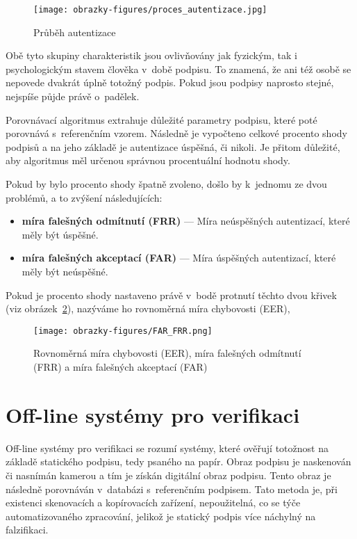 \begin{figure}[H]
  \centering
  \texttt{[image: obrazky-figures/proces\_autentizace.jpg]}
  \caption{Průběh autentizace~\cite{DrahanskýMartin2011}}
  \label{fig:proces_autentizace}
\end{figure}

Obě tyto skupiny charakteristik jsou ovlivňovány jak fyzickým, tak i psychologickým stavem člověka v~době podpisu.
To znamená, že ani též osobě se nepovede dvakrát úplně totožný podpis.
Pokud jsou podpisy naprosto stejné, nejspíše půjde právě o~padělek.

Porovnávací algoritmus extrahuje důležité parametry podpisu, které poté porovnává s~referenčním vzorem. 
Následně je vypočteno celkové procento shody podpisů a na jeho základě je autentizace úspěšná, či nikoli.
Je přitom důležité, aby algoritmus měl určenou správnou procentuální hodnotu shody. 

Pokud by bylo procento shody špatně zvoleno, došlo by k~jednomu ze dvou problémů, a to zvýšení následujících:
\begin{itemize}
  \item \textbf{míra falešných odmítnutí (FRR)} --- Míra neúspěšných autentizací, které měly být úspěšné.
  \item \textbf{míra falešných akceptací (FAR)} --- Míra úspěšných autentizací, které měly být neúspěšné.
\end{itemize}

Pokud je procento shody nastaveno právě v~bodě protnutí těchto dvou křivek (viz obrázek~\ref{fig:FAR_FRR}), nazýváme ho rovnoměrná míra chybovosti (EER), 

\begin{figure}[H]
  \centering
  \texttt{[image: obrazky-figures/FAR\_FRR.png]}
  \caption{Rovnoměrná míra chybovosti (EER), míra falešných odmítnutí (FRR) a míra falešných akceptací (FAR)~\cite{cursorinsight_frr_fa}} %
  \label{fig:FAR_FRR}
\end{figure}


\section{Off-line systémy pro verifikaci}
Off-line systémy pro verifikaci se rozumí systémy, které ověřují totožnost na základě statického podpisu, tedy psaného na papír. %
Obraz podpisu je naskenován či nasnímán kamerou a tím je získán digitální obraz podpisu.                                         %
Tento obraz je následně porovnáván v~databázi s~referenčním podpisem.                                                            %
Tato metoda je, při existenci skenovacích a kopírovacích zařízení, nepoužitelná, co se týče automatizovaného zpracování, jelikož je statický podpis více náchylný na falzifikaci.~\cite{RakRoman2008}%

